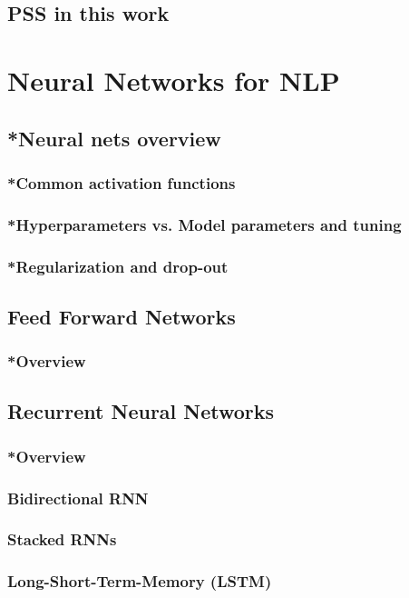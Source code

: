 \subsection{PSS in this work}
\pagebreak

\section{Neural Networks for NLP}
\subsection{*Neural nets overview}
\subsubsection{*Common activation functions}
\subsubsection{*Hyperparameters vs. Model parameters and tuning}
\subsubsection{*Regularization and drop-out}
\subsection{Feed Forward Networks}
\subsubsection{*Overview}
\subsection{Recurrent Neural Networks}
\subsubsection{*Overview}
\subsubsection{Bidirectional RNN}
\subsubsection{Stacked RNNs}
\subsubsection{Long-Short-Term-Memory (LSTM)}
